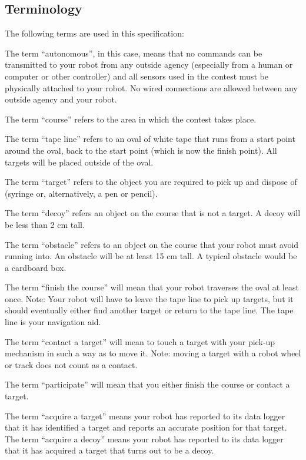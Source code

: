 \hypertarget{autotoc_md3_autotoc_md4}{}\subsection{Terminology}\label{autotoc_md3_autotoc_md4}
The following terms are used in this specification\+:
\begin{DoxyItemize}
\item The term “autonomous”, in this case, means that no commands can be transmitted to your robot from any outside agency (especially from a human or computer or other controller) and all sensors used in the contest must be physically attached to your robot. No wired connections are allowed between any outside agency and your robot.
\item The term “course” refers to the area in which the contest takes place.
\item The term “tape line” refers to an oval of white tape that runs from a start point around the oval, back to the start point (which is now the finish point). All targets will be placed outside of the oval.
\item The term “target” refers to the object you are required to pick up and dispose of (syringe or, alternatively, a pen or pencil).
\item The term “decoy” refers an object on the course that is not a target. A decoy will be less than 2 cm tall.
\item The term “obstacle” refers to an object on the course that your robot must avoid running into. An obstacle will be at least 15 cm tall. A typical obstacle would be a cardboard box.
\item The term “finish the course” will mean that your robot traverses the oval at least once. Note\+: Your robot will have to leave the tape line to pick up targets, but it should eventually either find another target or return to the tape line. The tape line is your navigation aid.
\item The term “contact a target” will mean to touch a target with your pick-\/up mechanism in such a way as to move it. Note\+: moving a target with a robot wheel or track does not count as a contact.
\item The term “participate” will mean that you either finish the course or contact a target.
\item The term “acquire a target” means your robot has reported to its data logger that it has identified a target and reports an accurate position for that target. The term “acquire a decoy” means your robot has reported to its data logger that it has acquired a target that turns out to be a decoy.

\end{DoxyItemize}
